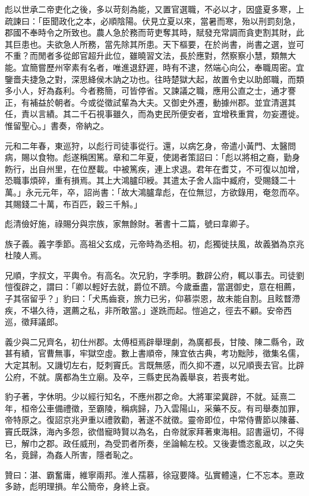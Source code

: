 \begin{pinyinscope}
彪以世承二帝吏化之後，多以苛刻為能，又置官選職，不必以才，因盛夏多寒，上疏諫曰：「臣聞政化之本，必順陰陽。伏見立夏以來，當暑而寒，殆以刑罰刻急，郡國不奉時令之所致也。農人急於務而苛吏奪其時，賦發充常調而貪吏割其財，此其巨患也。夫欲急人所務，當先除其所患。天下樞要，在於尚書，尚書之選，豈可不重？而閒者多從郎官超升此位，雖曉習文法，長於應對，然察察小慧，類無大能。宜簡嘗歷州宰素有名者，唯進退舒遲，時有不逮，然端心向公，奉職周密。宜鑒嗇夫捷急之對，深思絳侯木訥之功也。往時楚獄大起，故置令史以助郎職，而類多小人，好為姦利。今者務簡，可皆停省。又諫議之職，應用公直之士，通才謇正，有補益於朝者。今或從徵試輩為大夫。又御史外遷，動據州郡。並宜清選其任，責以言績。其二千石視事雖久，而為吏民所便安者，宜增秩重賞，勿妄遷徙。惟留聖心。」書奏，帝納之。

元和二年春，東巡狩，以彪行司徒事從行。還，以病乞身，帝遣小黃門、太醫問病，賜以食物。彪遂稱困篤。章和二年夏，使謁者策詔曰：「彪以將相之裔，勤身飭行，出自州里，在位歷載。中被篤疾，連上求退。君年在耆艾，不可復以加增，恐職事煩碎，重有損焉。其上大鴻臚印綬。其遣太子舍人詣中臧府，受賜錢二十萬。」永元元年，卒，詔尚書：「故大鴻臚韋彪，在位無愆，方欲錄用，奄忽而卒。其賜錢二十萬，布百匹，穀三千斛。」

彪清儉好施，祿賜分與宗族，家無餘財。著書十二篇，號曰韋卿子。

族子義。義字季節。高祖父玄成，元帝時為丞相。初，彪獨徙扶風，故義猶為京兆杜陵人焉。

兄順，字叔文，平輿令。有高名。次兄豹，字季明。數辟公府，輒以事去。司徒劉愷復辟之，謂曰：「卿以輕好去就，爵位不躋。今歲垂盡，當選御史，意在相薦，子其宿留乎？」豹曰：「犬馬齒衰，旅力已劣，仰慕崇恩，故未能自割。且眩瞀滯疾，不堪久待，選薦之私，非所敢當。」遂跣而起。愷追之，徑去不顧。安帝西巡，徵拜議郎。

義少與二兄齊名，初仕州郡。太傅桓焉辟舉理劇，為廣都長，甘陵、陳二縣令，政甚有績，官曹無事，牢獄空虛。數上書順帝，陳宜依古典，考功黜陟，徵集名儒，大定其制。又譏切左右，貶刺竇氏。言既無感，而久抑不遷，以兄順喪去官。比辟公府，不就。廣都為生立廟。及卒，三縣吏民為義舉哀，若喪考妣。

豹子著，字休明。少以經行知名，不應州郡之命。大將軍梁冀辟，不就。延熹二年，桓帝公車備禮徵，至霸陵，稱病歸，乃入雲陽山，采藥不反。有司舉奏加罪，帝特原之。復詔京兆尹重以禮敦勸，著遂不就徵。靈帝即位，中常侍曹節以陳蕃、竇氏既誅，海內多怨，欲借寵時賢以為名，白帝就家拜著東海相。詔書逼切，不得已，解巾之郡。政任威刑，為受罰者所奏，坐論輸左校。又後妻憍恣亂政，以之失名，竟歸，為姦人所害，隱者恥之。

贊曰：湛、霸奮庸，維寧兩邦。淮人孺慕，徐寇要降。弘實體遠，仁不忘本。憙政多跡，彪明理損。牟公簡帝，身終上袞。


\end{pinyinscope}